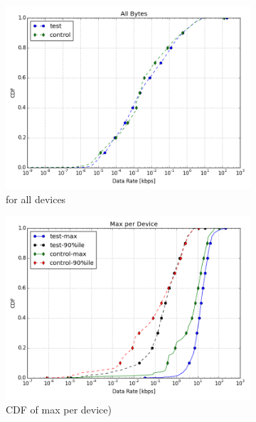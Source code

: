 \begin{figure}[t]
\begin{minipage}{1\linewidth}
\centering
%
\begin{subfigure}[b]{0.3\linewidth}
\includegraphics[width=\linewidth]{figures/cdf-all-bytes.png}
               \caption{for all devices}
\end{subfigure}
%
\begin{subfigure}[b]{0.3\linewidth}
\includegraphics[width=\linewidth]{figures/cdf-max-per-device.png}
               \caption{CDF of max per device)}
\end{subfigure}
%
\begin{subfigure}[b]{0.39\linewidth}

\end{subfigure}
\end{minipage}
\end{figure}
